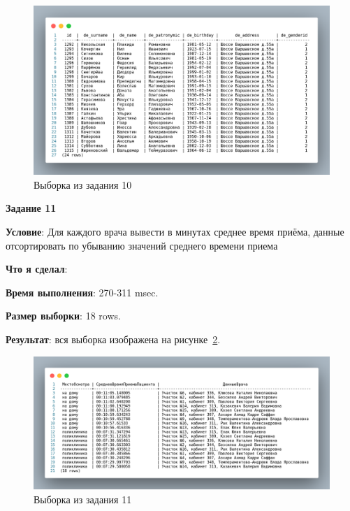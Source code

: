 \begin{figure}[!h]
  \centering

  \includegraphics[width=16cm]
  {../sql/task10/10-out.png}

  \caption{Выборка из задания 10}

  \label{fig:t10}
\end{figure}

\newpage


\begin{center}
  \textbf{Задание 11}
\end{center}
  
\textbf{Условие}:
Для каждого врача вывести в минутах среднее время приёма, данные отсортировать по
убыванию значений среднего времени приема

\textbf{Что я сделал}:



\textbf{Время выполнения}: 270-311 msec.

\textbf{Размер выборки}: 18 rows.

\textbf{Результат}: вся выборка изображена на рисунке~\ref{fig:t11}.

\begin{figure}[!h]
  \centering

  \includegraphics[width=16cm]
  {../sql/task11/11-out.png}

  \caption{Выборка из задания 11}

  \label{fig:t11}
\end{figure}









\newpage
